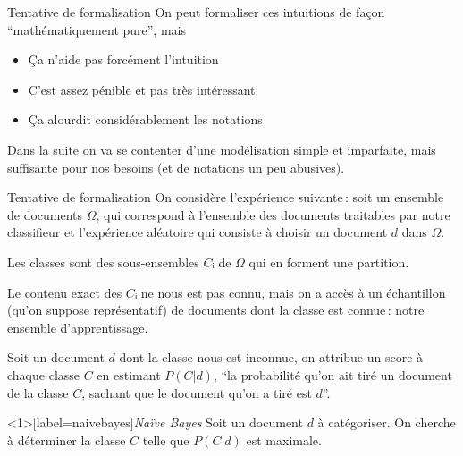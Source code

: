 \documentclass[../allslides.tex]{subfiles}
\begin{document}
\begin{frame}{Tentative de formalisation}
	On peut formaliser ces intuitions de façon \enquote{mathématiquement pure}, mais

	\begin{itemize}
		\item Ça n'aide pas forcément l'intuition
		\item C'est assez pénible et pas très intéressant
		\item Ça alourdit considérablement les notations
	\end{itemize}

	Dans la suite on va se contenter d'une modélisation \alert{simple} et imparfaite, mais suffisante pour nos besoins (et de notations un peu abusives).
\end{frame}

\begin{frame}{Tentative de formalisation}
	On considère l'expérience suivante : soit \alert{un ensemble de documents} \(Ω\), qui correspond à l'ensemble des documents traitables par notre classifieur et l'expérience aléatoire qui consiste à choisir un document \(d\) dans \(Ω\).

	Les classes sont des sous-ensembles \(Cᵢ\) de \(Ω\) qui en forment une partition.

	\pause

	Le contenu exact des \(Cᵢ\) ne nous est pas connu, mais on a accès à un \alert{échantillon} (qu'on suppose représentatif) de documents dont la classe est connue : notre ensemble d'apprentissage.

	\pause

	Soit un document \(d\) dont la classe nous est inconnue, on attribue un score à chaque classe \(C\) en \alert{estimant} \(P(C|d)\), \enquote{la probabilité qu'on ait tiré un document de la classe \(C\), sachant que le document qu'on a tiré est \(d\)}.
\end{frame}

\begin{frame}<1>[label=naivebayes]{\emph{Naïve Bayes}}
	Soit un document \(d\) à catégoriser.
	On cherche à déterminer la classe \(C\) telle que \(P(C|d)\) est maximale.




\end{frame}
\end{document}
